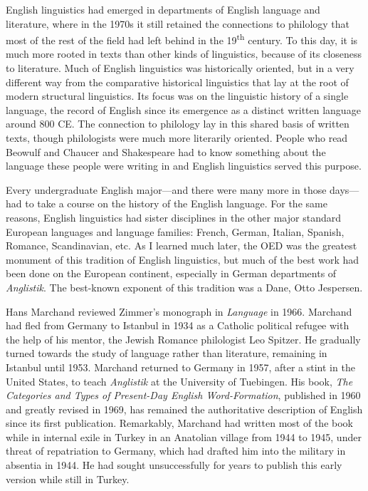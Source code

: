 \documentclass[output=paper]{langsci/langscibook}
\begin{document}
English linguistics had emerged in departments of English language and
literature, where in the 1970s it still retained the connections to
philology that most of the rest of the field had left behind in the
19\textsuperscript{th} century. To this day, it is much more rooted in
texts than other kinds of linguistics, because of its closeness to
literature. Much of English linguistics was historically oriented, but
in a very different way from the comparative historical linguistics that
lay at the root of modern structural linguistics. Its focus was on the
linguistic history of a single language, the record of English since its
emergence as a distinct written language around 800 CE. The connection
to philology lay in this shared basis of written texts, though
philologists were much more literarily oriented. People who read Beowulf
and Chaucer and Shakespeare had to know something about the language
these people were writing in and English linguistics served this
purpose.

Every undergraduate English major---and there were many more in those
days---had to take a course on the history of the English language. For
the same reasons, English linguistics had sister disciplines in the
other major standard European languages and language families: French,
German, Italian, Spanish, Romance, Scandinavian, etc. As I learned much
later, the OED was the greatest monument of this tradition of English
linguistics, but much of the best work had been done on the European
continent, especially in German departments of \emph{Anglistik}. The
best-known exponent of this tradition was a Dane, Otto Jespersen.

Hans Mar\-chand reviewed Zimmer's monograph in \emph{Language} in 1966.
Mar\-chand had fled from Germany to Istanbul in 1934 as a Catholic
political refugee with the help of his mentor, the Jewish Romance
philologist Leo Spitzer. He gradually turned towards the study of
language rather than literature, remaining in Istanbul until 1953.
Marchand returned to Germany in 1957, after a stint in the United
States, to teach \emph{Anglistik} at the University of Tuebingen. His
book, \emph{The Categories and Types of Present-Day English
Word-Formation}, published in 1960 and greatly revised in 1969, has
remained the authoritative description of English  since
its first publication. Remarkably, Marchand had written most of the book
while in internal exile in Turkey in an Anatolian village from 1944 to
1945, under threat of repatriation to Germany, which had drafted him
into the military in absentia in 1944. He had sought unsuccessfully for
years to publish this early version while still in Turkey.
\end{document}
